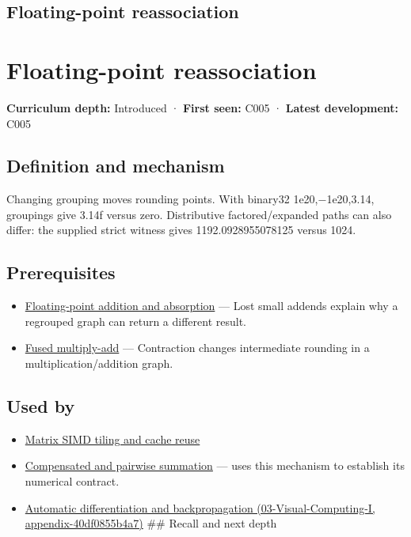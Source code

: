 \hypertarget{appendix-c2ac4a84c283}{}
\section*{Floating-point reassociation}
\chapter{Floating-point reassociation}\label{appendix-c2ac4a84c283-floating-point-reassociation}

\textbf{Curriculum depth:} Introduced · \textbf{First seen:} C005 · \textbf{Latest development:} C005

\section{Definition and mechanism}\label{appendix-c2ac4a84c283-definition-and-mechanism}

Changing grouping moves rounding points. With binary32 1e20,−1e20,3.14, groupings give 3.14f versus zero. Distributive factored/expanded paths can also differ: the supplied strict witness gives 1192.0928955078125 versus 1024.

\section{Prerequisites}\label{appendix-c2ac4a84c283-prerequisites}

\begin{itemize}
\tightlist
\item
  \hyperref[appendix-a1b1b4580dfd]{Floating-point addition and absorption} --- Lost small addends explain why a regrouped graph can return a different result.
\item
  \hyperref[appendix-41e8ef22a21e]{Fused multiply-add} --- Contraction changes intermediate rounding in a multiplication/addition graph.
\end{itemize}

\section{Used by}\label{appendix-c2ac4a84c283-used-by}

\begin{itemize}
\item
  \hyperref[appendix-1bfb7c657105]{Matrix SIMD tiling and cache reuse}
\item
  \hyperref[appendix-df318da57389]{Compensated and pairwise summation} --- uses this mechanism to establish its numerical contract.
\item
  \href{../03-Visual-Computing-I/main.pdf\#nameddest=appendix-40df0855b4a7}{Automatic differentiation and backpropagation (03-Visual-Computing-I, appendix-40df0855b4a7)} \#\# Recall and next depth
\end{itemize}

